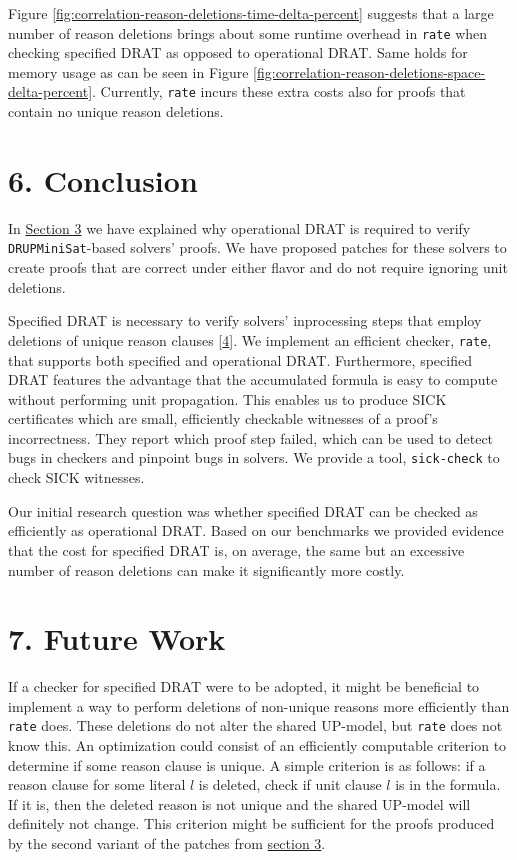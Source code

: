 \documentclass[
]{report}
\begin{document}
Figure \ref{fig:correlation-reason-deletions-time-delta-percent}
suggests that a large number of reason deletions brings about some
runtime overhead in \texttt{rate} when checking specified DRAT as
opposed to operational DRAT. Same holds for memory usage as can be seen
in Figure \ref{fig:correlation-reason-deletions-space-delta-percent}.
Currently, \texttt{rate} incurs these extra costs also for proofs that
contain no unique reason deletions.

\hypertarget{conclusion}{%
\chapter{6. Conclusion}\label{conclusion}}

In
\protect\hyperlink{drat-proofs-without-deletions-of-unique-reason-clauses}{Section
3} we have explained why operational DRAT is required to verify
\texttt{DRUPMiniSat}-based solvers' proofs. We have proposed patches for
these solvers to create proofs that are correct under either flavor and
do not require ignoring unit deletions.

Specified DRAT is necessary to verify solvers' inprocessing steps that
employ deletions of unique reason clauses
{[}\protect\hyperlink{ref-rebola2018two}{4}{]}. We implement an
efficient checker, \texttt{rate}, that supports both specified and
operational DRAT. Furthermore, specified DRAT features the advantage
that the accumulated formula is easy to compute without performing unit
propagation. This enables us to produce SICK certificates which are
small, efficiently checkable witnesses of a proof's incorrectness. They
report which proof step failed, which can be used to detect bugs in
checkers and pinpoint bugs in solvers. We provide a tool,
\texttt{sick-check} to check SICK witnesses.

Our initial research question was whether specified DRAT can be checked
as efficiently as operational DRAT. Based on our benchmarks we provided
evidence that the cost for specified DRAT is, on average, the same but
an excessive number of reason deletions can make it significantly more
costly.

\hypertarget{future-work}{%
\chapter{7. Future Work}\label{future-work}}

If a checker for specified DRAT were to be adopted, it might be
beneficial to implement a way to perform deletions of non-unique reasons
more efficiently than \texttt{rate} does. These deletions do not alter
the shared UP-model, but \texttt{rate} does not know this. An
optimization could consist of an efficiently computable criterion to
determine if some reason clause is unique. A simple criterion is as
follows: if a reason clause for some literal \(l\) is deleted, check if
unit clause \(l\) is in the formula. If it is, then the deleted reason
is not unique and the shared UP-model will definitely not change. This
criterion might be sufficient for the proofs produced by the second
variant of the patches from
\protect\hyperlink{drat-proofs-without-deletions-of-unique-reason-clauses}{section
3}.
\end{document}
